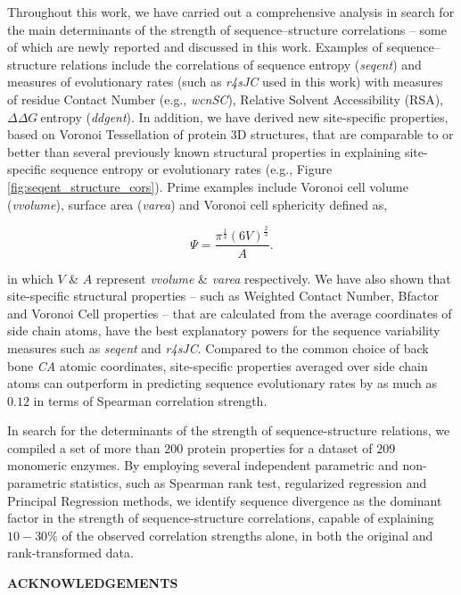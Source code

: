 \documentclass[11pt]{article}
\newcommand{\ddg}{$\Delta\Delta G~$}
\def\Acknowledgements{\bigskip  \bigskip \begin{center} \begin{large}
             \bf ACKNOWLEDGEMENTS \end{large}\end{center}}
\begin{document}
        Throughout this work, we have carried out a comprehensive analysis in search for the main determinants of the strength of sequence--structure correlations -- some of which are newly reported and discussed in this work. Examples of sequence--structure relations include the correlations of sequence entropy ({\it seqent}) and measures of evolutionary rates (such as {\it r4sJC} used in this work) with measures of residue Contact Number (e.g., {\it wcnSC}), Relative Solvent Accessibility (RSA), \ddg entropy ({\it ddgent}). In addition, we have derived new site-specific properties, based on Voronoi Tessellation of protein 3D structures, that are comparable to or better than several previously known structural properties in explaining site-specific sequence entropy or evolutionary rates (e.g., Figure \ref{fig:seqent_structure_cors}). Prime examples include Voronoi cell volume ({\it vvolume}), surface area ({\it varea}) and Voronoi cell sphericity defined as,

        \begin{equation}
        \label{eqn:sphericity}
        \Psi = \frac{\pi^{\frac{1}{3}}(6V)^{\frac{2}{3}}}{A}.
        \end{equation}

        in which $V$ \& $A$ represent {\it vvolume} \& {\it varea} respectively. We have also shown that site-specific structural properties -- such as Weighted Contact Number, Bfactor and Voronoi Cell properties -- that are calculated from the average coordinates of side chain atoms, have the best explanatory powers for the sequence variability measures such as {\it seqent} and {\it r4sJC}. Compared to the common choice of back bone {\it CA} atomic coordinates, site-specific properties averaged over side chain atoms can outperform in predicting sequence evolutionary rates by as much as $0.12$ in terms of Spearman correlation strength.

        In search for the determinants of the strength of sequence-structure relations, we compiled a set of more than $200$ protein properties for a dataset of $209$ monomeric enzymes. By employing several independent parametric and non-parametric statistics, such as Spearman rank test, regularized regression and Principal Regression methods, we identify sequence divergence as the dominant factor in the strength of sequence-structure correlations, capable of explaining $10-30\%$ of the observed correlation strengths alone, in both the original and rank-transformed data.


\Acknowledgements
\end{document}
